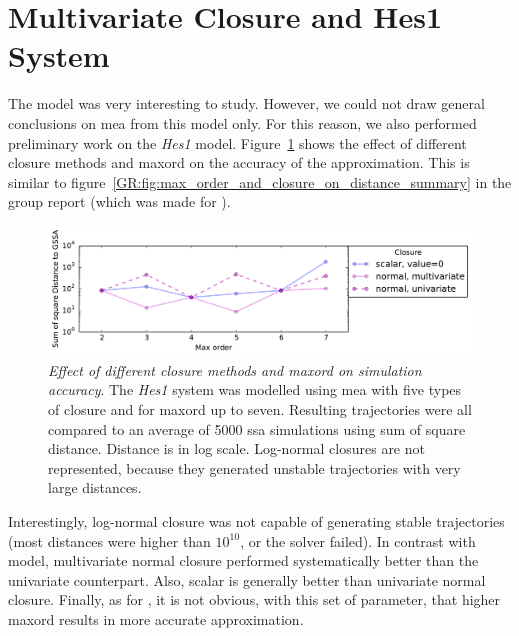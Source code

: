 \section{Multivariate Closure and Hes1 System}
The \pft{} model was very interesting to study. However, we could not draw general conclusions on \gls{mea} from this model only.
For this reason, we also performed preliminary work on the \emph{Hes1} model\cite{ale_general_2013}.
Figure~\ref{fig:hes1} shows the effect of different closure methods and \gls{maxord} on the accuracy of the approximation.
This is similar to figure~\ref*{GR:fig:max_order_and_closure_on_distance_summary} in the group report (which was made for \pft).
\begin{figure}[tbh]
\begin{centering}
\includegraphics[width=0.95\textwidth{}]{FigureHes1Summary-pdf-7.pdf}
\caption{\emph{Effect of different closure methods and \gls{maxord} on simulation accuracy}.
The \emph{Hes1} system was modelled using \gls{mea} with five types of closure and for \gls{maxord} up to seven.
Resulting trajectories were all compared to an average of 5000 \gls{ssa} simulations using sum of square distance.
Distance is in log scale.
Log-normal closures are not represented, because they generated  unstable trajectories with very large distances.
}
\label{fig:hes1}
\end{centering}
\end{figure}

Interestingly, log-normal closure was not capable of generating stable trajectories (most distances were higher than $10^{10}$, or the solver failed).  
In contrast with \pft{} model, multivariate normal closure performed systematically better than the univariate counterpart.
Also, scalar is generally better than univariate normal closure.
Finally, as for \pft, it is not obvious, with this set of parameter, that higher \gls{maxord} results in more accurate approximation.



